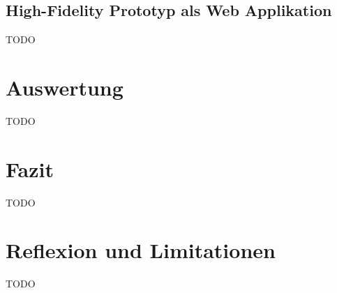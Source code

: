 \documentclass[12pt, oneside]{article}
\begin{document}
\subsection{High-Fidelity Prototyp als Web Applikation}
TODO

\clearpage
\section{Auswertung}
TODO

\clearpage
\section{Fazit}
TODO

\clearpage
\section{Reflexion und Limitationen}
TODO


\clearpage



\clearpage
\end{document}

